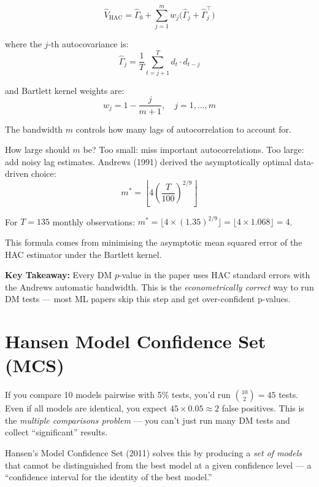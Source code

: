 \documentclass[11pt]{article}
\newcommand{\concept}[2]{%
  \begin{tcolorbox}[conceptbox, title={#1}]
  #2
  \end{tcolorbox}
}
\newcommand{\mathblock}[2]{%
  \begin{tcolorbox}[mathbox, title={Math: #1}]
  #2
  \end{tcolorbox}
}
\newcommand{\keypoint}[1]{%
  \begin{tcolorbox}[keybox]
  \textbf{Key Takeaway:} #1
  \end{tcolorbox}
}
\begin{document}
\mathblock{Newey-West (1987) HAC Estimator}{
\[
  \hat V_{\text{HAC}} = \hat\Gamma_0
    + \sum_{j=1}^{m} w_j \bigl(\hat\Gamma_j + \hat\Gamma_j^\top\bigr)
\]

where the $j$-th autocovariance is:
\[
  \hat\Gamma_j = \frac{1}{T}\sum_{t=j+1}^{T} d_t \cdot d_{t-j}
\]

and Bartlett kernel weights are:
\[
  w_j = 1 - \frac{j}{m+1}, \quad j = 1, \ldots, m
\]

The bandwidth $m$ controls how many lags of autocorrelation to account for.
}

\mathblock{Andrews (1991) Automatic Bandwidth}{
How large should $m$ be? Too small: miss important autocorrelations.
Too large: add noisy lag estimates. Andrews (1991) derived the
asymptotically optimal data-driven choice:
\[
  m^* = \left\lfloor 4 \left(\frac{T}{100}\right)^{2/9} \right\rfloor
\]

For $T = 135$ monthly observations: $m^* = \lfloor 4 \times (1.35)^{2/9}
\rfloor = \lfloor 4 \times 1.068 \rfloor = 4$.

This formula comes from minimising the asymptotic mean squared error of
the HAC estimator under the Bartlett kernel.
}

\keypoint{Every DM $p$-value in the paper uses HAC standard errors with
the Andrews automatic bandwidth. This is the \emph{econometrically
correct} way to run DM tests --- most ML papers skip this step and
get over-confident p-values.}

\section{Hansen Model Confidence Set (MCS)}

\concept{The Multiple Comparisons Problem}{
If you compare 10 models pairwise with 5\% tests, you'd run $\binom{10}{2}=45$
tests. Even if all models are identical, you expect $45 \times 0.05 \approx 2$
false positives. This is the \emph{multiple comparisons problem} --- you
can't just run many DM tests and collect ``significant'' results.

Hansen's Model Confidence Set (2011) solves this by producing a
\emph{set of models} that cannot be distinguished from the best model at a
given confidence level --- a ``confidence interval for the identity of
the best model.''
}
\end{document}
